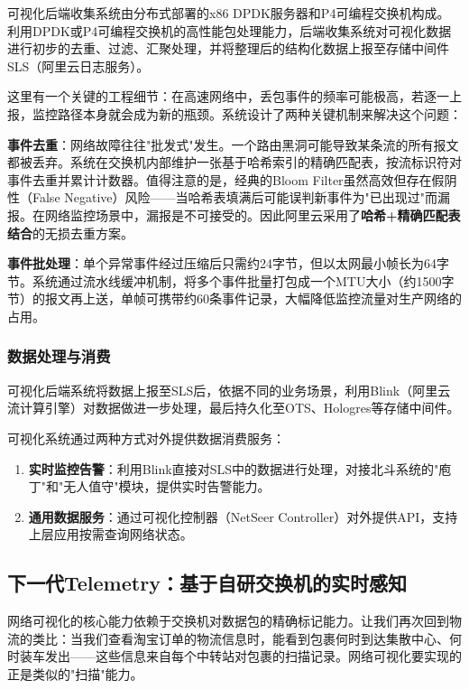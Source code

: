 可视化后端收集系统由分布式部署的x86 DPDK服务器和P4可编程交换机构成。利用DPDK或P4可编程交换机的高性能包处理能力，后端收集系统对可视化数据进行初步的去重、过滤、汇聚处理，并将整理后的结构化数据上报至存储中间件SLS（阿里云日志服务）。

这里有一个关键的工程细节：在高速网络中，丢包事件的频率可能极高，若逐一上报，监控路径本身就会成为新的瓶颈。系统设计了两种关键机制来解决这个问题：

\textbf{事件去重}：网络故障往往"批发式"发生。一个路由黑洞可能导致某条流的所有报文都被丢弃。系统在交换机内部维护一张基于哈希索引的精确匹配表，按流标识符对事件去重并累计计数器。值得注意的是，经典的Bloom Filter虽然高效但存在假阴性（False Negative）风险——当哈希表填满后可能误判新事件为"已出现过"而漏报。在网络监控场景中，漏报是不可接受的。因此阿里云采用了\textbf{哈希+精确匹配表结合}的无损去重方案。

\textbf{事件批处理}：单个异常事件经过压缩后只需约24字节，但以太网最小帧长为64字节。系统通过流水线缓冲机制，将多个事件批量打包成一个MTU大小（约1500字节）的报文再上送，单帧可携带约60条事件记录，大幅降低监控流量对生产网络的占用。

\subsubsection{数据处理与消费}

可视化后端系统将数据上报至SLS后，依据不同的业务场景，利用Blink（阿里云流计算引擎）对数据做进一步处理，最后持久化至OTS、Hologres等存储中间件。

可视化系统通过两种方式对外提供数据消费服务：
\begin{enumerate}
    \item \textbf{实时监控告警}：利用Blink直接对SLS中的数据进行处理，对接北斗系统的"庖丁"和"无人值守"模块，提供实时告警能力。
    \item \textbf{通用数据服务}：通过可视化控制器（NetSeer Controller）对外提供API，支持上层应用按需查询网络状态。
\end{enumerate}

\subsection{下一代Telemetry：基于自研交换机的实时感知}

网络可视化的核心能力依赖于交换机对数据包的精确标记能力。让我们再次回到物流的类比：当我们查看淘宝订单的物流信息时，能看到包裹何时到达集散中心、何时装车发出——这些信息来自每个中转站对包裹的扫描记录。网络可视化要实现的正是类似的"扫描"能力。

